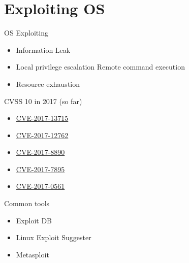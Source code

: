 \documentclass{curs}
\begin{document}
\section{Exploiting OS}

\begin{frame}{OS Exploiting}
  \begin{itemize}
    \item Information Leak
    \item Local privilege escalation
    \iten Remote command execution
    \item Resource exhaustion
  \end{itemize}
\end{frame}

\begin{frame}{CVSS 10 in 2017 (so far)}
  \begin{itemize}
    \item \href{http://www.cvedetails.com/cve/CVE-2017-13715/}{CVE-2017-13715}
    \item \href{http://www.cvedetails.com/cve/CVE-2017-12762/}{CVE-2017-12762}
    \item \href{http://www.cvedetails.com/cve/CVE-2017-8890/}{CVE-2017-8890}
    \item \href{http://www.cvedetails.com/cve/CVE-2017-7895/}{CVE-2017-7895}
    \item \href{http://www.cvedetails.com/cve/CVE-2017-0561/}{CVE-2017-0561}
  \end{itemize}
\end{frame}

\begin{frame}{Common tools}
  \begin{itemize}
    \item Exploit DB
    \item Linux Exploit Suggester
    \item Metasploit
  \end{itemize}
\end{frame}
\end{document}
